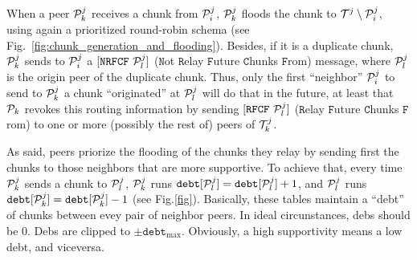 %
%

When a peer ${\cal P}^j_k$ receives a chunk from ${\cal P}^j_i$,
${\cal P}^j_k$ floods the chunk to ${\cal T}^j \setminus {\cal
P}^j_i$, using again a prioritized round-robin schema (see
Fig.~\ref{fig:chunk_generation_and_flooding}). Besides, if it is a
duplicate chunk, ${\cal P}^j_k$ sends to ${\cal P}^j_i$ a
$[\mathtt{NRFCF}~{\cal P}^j_l]$ ($\mathtt{N}$ot $\mathtt{R}$elay
$\mathtt{F}$uture $\mathtt{C}$hunks $\mathtt{F}$rom) message, where
${\cal P}^j_l$ is the origin peer of the duplicate chunk. Thus, only
the first ``neighbor'' ${\cal P}^j_i$ to send to ${\cal P}^j_k$ a
chunk ``originated'' at ${\cal P}^j_l$ will do that in the future, at
least that ${\cal P}_k$ revokes this routing information by sending
$[\mathtt{RFCF}~{\cal P}^j_l]$ ($\mathtt{R}$elay $\mathtt{F}$uture
$\mathtt{C}$hunks $\mathtt{F}$rom) to one or more (possibly the rest
of) peers of ${\cal T}^j_k$.

As said, peers priorize the flooding of the chunks they relay by
sending first the chunks to those neighbors that are more
supportive. To achieve that, every time ${\cal P}^j_k$ sends a chunk
to ${\cal P}^j_l$, ${\cal P}^j_k$ runs $\mathtt{debt}[{\cal P}^j_l]
= \mathtt{debt}[{\cal P}^j_l]+1$, and ${\cal P}^j_l$ runs
$\mathtt{debt}[{\cal P}^j_k] =
\mathtt{debt}[{\cal P}^j_k]-1$ (see Fig.\ref{fig}). Basically, these
tables maintain a ``debt'' of chunks between evey pair of neighbor
peers. In ideal circunstances, debs should be $0$. Debs are clipped to
$\pm\mathtt{debt}_{\text{max}}$. Obviously, a high supportivity means
a low debt, and viceversa.

\begin{comment}
In each round, peers check if a chunk have been received from the rest
of peers of the team (${\cal P}_k\in {\cal T}_j)$). If not, peers send
a $[\mathtt{propagate}~{\cal P}_i]$ to one or more (possibly
to the rest of) peers of the team, where ${\cal P}_i$ is the origin peer
of the missing chunk. At this point, the process continues as
described in Section~\ref{dbs:chunk_flooding}.
\end{comment}

\begin{comment}
For each ${\cal P}_k\in N({\cal P}_i)$, ${\cal P}_i$ checks if a chunk
has been received from ${\cal P}_k$. If ${\cal P}_i$ detects that
${\cal P}_k$ has not sent a chunk to it during $L$ consecutive rounds,
performs $N({\cal P}_i) = N({\cal P}_i)\setminus{\cal P}_k$, and stops
sending to ${\cal P}_k$ more chunks.
\end{comment}
\begin{comment}
computes a
``chunk-debt'', denoted by $d({\cal P}_k)$, that is incremented each
time a chunk is received from ${\cal P}_k$ and decremented each time a
chunk is sent to ${\cal P}_k$. If ${\cal P}_i$ verifies that $d({\cal
  P}_k)>D$ (the maximum debt), then ${\cal P}_i$ considers that ${\cal
  P}_k$ is unable to communicate with it, performs $N({\cal P}_i) =
N({\cal P}_i)\setminus{\cal P}_k$, and stops sending to ${\cal P}_k$
more chunks.
\end{comment}


